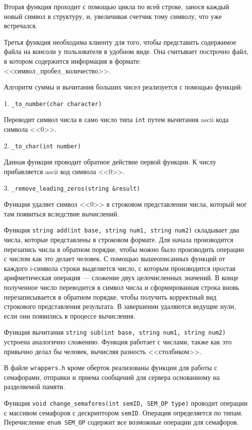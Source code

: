 \documentclass[a4paper,14pt]{extarticle}
\begin{document}
Вторая функция проходит с помощью цикла по всей строке, занося каждый новый символ в структуру, и, увеличивая счетчик тому символу, что уже встречался.

Третья функция необходима клиенту для того, чтобы представить содержимое файла на консоли у пользователя в удобном виде. Она считывает построчно файл, в котором содержится информация в формате:
<<символ\_пробел\_количество>>.

Алгоритм суммы и вычитания больших чисел реализуется с помощью функций:

1. \verb|_to_number(char character)|

Переводит символ числа в само число типа \verb|int| путем вычитания ascii кода символа <<0>>.

2. \verb|_to_char(int number)|

Данная функция проводит обратное действие первой функции. К числу прибавляется ascii код символа <<0>>.

3. \verb|_remove_leading_zeros(string &result)|

Функция удаляет символ <<0>> в строковом представлении числа, который мог там появиться вследствие вычислений.

Функция \verb|string add(int base, string num1, string num2)| складывает два числа, которые представлены в строковом формате. Для начала производится перезапись числа в обратном порядке, чтобы можно было производить операции с числом как это делает человек. С помощью вышеописанных функций от каждого i-символа строки выделяется число, с которым производится простая арифметическая операция --- сложение двух целочисленных значений. В конце полученное число переводится в символ числа и сформированная строка вновь перезаписывается в обратном порядке, чтобы получить корректный вид строкового представления результата. В завершении удаляются ведущие нули, если они появились в процессе вычисления.

Функция вычитания \verb|string sub(int base, string num1, string num2)| устроена аналогично сложению. Функция работает с числами, также как это привычно делал бы человек, вычисляя разность <<столбиком>>. 

В файле \verb|wrappers.h| кроме оберток реализованы функции для работы с семафорами, отправки и приема сообщений для сервера основанному на разделяемой памяти.

Функция \verb|void change_semafores(int semID, SEM_OP type)| проводит операции с массивом семафоров с дескриптором \verb|semID|. Операция определяется по типам. Перечисление \verb|enum SEM_OP| содержит все возможные операции для семафоров.
\end{document}

